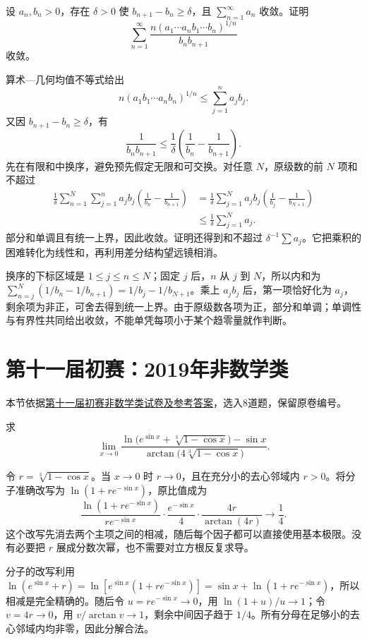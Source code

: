 \documentclass[12pt,fontset=fandol]{ctexart}
\begin{document}
\begin{example}\label{nm-2018-7}
设 $a_n,b_n>0$，存在 $\delta>0$ 使 $b_{n+1}-b_n\geq\delta$，且 $\sum_{n=1}^\infty a_n$ 收敛。证明
\[
 \sum_{n=1}^\infty
 \frac{n(a_1\cdots a_n b_1\cdots b_n)^{1/n}}{b_nb_{n+1}}
\]
收敛。
\end{example}
\begin{solve}
算术—几何均值不等式给出
\[
 n(a_1b_1\cdots a_nb_n)^{1/n}\leq\sum_{j=1}^n a_jb_j.
\]
又因 $b_{n+1}-b_n\geq\delta$，有
\[
 \frac1{b_nb_{n+1}}\leq\frac1\delta\left(\frac1{b_n}-\frac1{b_{n+1}}\right).
\]
先在有限和中换序，避免预先假定无限和可交换。对任意 $N$，原级数的前 $N$ 项和不超过
\begin{align*}
 \frac1\delta\sum_{n=1}^N\sum_{j=1}^na_jb_j
 \left(\frac1{b_n}-\frac1{b_{n+1}}\right)
 &=\frac1\delta\sum_{j=1}^Na_jb_j
 \left(\frac1{b_j}-\frac1{b_{N+1}}\right)\\
 &\leq\frac1\delta\sum_{j=1}^Na_j.
\end{align*}
部分和单调且有统一上界，因此收敛。证明还得到和不超过 $\delta^{-1}\sum a_j$。它把乘积的困难转化为线性和，再利用差分结构望远镜相消。

换序的下标区域是 $1\le j\le n\le N$；固定 $j$ 后，$n$ 从 $j$ 到 $N$，所以内和为 $\sum_{n=j}^N(1/b_n-1/b_{n+1})=1/b_j-1/b_{N+1}$。乘上 $a_jb_j$ 后，第一项恰好化为 $a_j$，剩余项为非正，可舍去得到统一上界。由于原级数各项为正，部分和单调；单调性与有界性共同给出收敛，不能单凭每项小于某个趋零量就作判断。

\end{solve}

\section{第十一届初赛：2019年非数学类}
本节依据\href{https://math.ecnu.edu.cn/llin/pdf_files/nonmathans2019.pdf}{第十一届初赛非数学类试卷及参考答案}，选入8道题，保留原卷编号。

\begin{example}\label{nm-2019-1a}
求
\[
 \lim_{x\to0}\frac{\ln\bigl(e^{\sin x}+\sqrt[3]{1-\cos x}\bigr)-\sin x}
 {\arctan\bigl(4\sqrt[3]{1-\cos x}\bigr)}.
\]
\end{example}
\begin{solve}
令 $r=\sqrt[3]{1-\cos x}$。当 $x\to0$ 时 $r\to0$，且在充分小的去心邻域内 $r>0$。将分子准确改写为 $\ln(1+r e^{-\sin x})$，原比值成为
\[
 \frac{\ln(1+r e^{-\sin x})}{r e^{-\sin x}}
 \cdot\frac{e^{-\sin x}}4\cdot
 \frac{4r}{\arctan(4r)}\longrightarrow\frac14.
\]
这个改写先消去两个主项之间的相减，随后每个因子都可以直接使用基本极限。没有必要把 $r$ 展成分数次幂，也不需要对立方根反复求导。

分子的改写利用 $\ln(e^{\sin x}+r)=\ln[e^{\sin x}(1+re^{-\sin x})]=\sin x+\ln(1+re^{-\sin x})$，所以相减是完全精确的。随后令 $u=re^{-\sin x}\to0$，用 $\ln(1+u)/u\to1$；令 $v=4r\to0$，用 $v/\arctan v\to1$，剩余中间因子趋于 $1/4$。所有分母在足够小的去心邻域内均非零，因此分解合法。

\end{solve}
\end{document}
